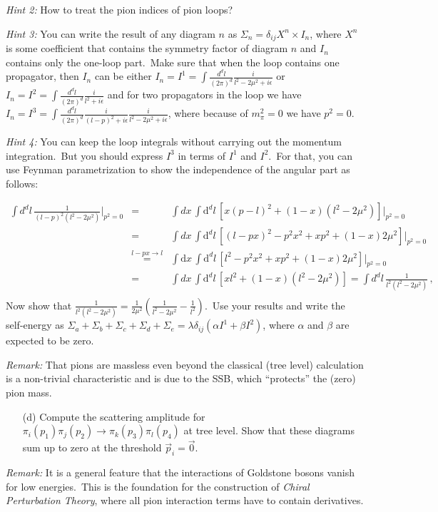 \documentclass[prd,%
,superscriptaddress,%
nofootinbib,%
tightenlines ]{revtex4}
\newcommand{\dd}{\mathrm{d}}
\newcommand{\comment}[1]{\textbf{[#1]}}
\begin{document}
\begin{itemize}
\emph{Hint 2:} How to treat the pion indices of pion loops?


\emph{Hint 3:} You can write the result of any diagram $n$ as $\Sigma_n = \delta_{i j} X^n \times I_n$, where $X^n$ is some coefficient that contains the symmetry factor of diagram $n$ and $I_n$ contains only the one-loop part.~Make sure that when the loop contains one propagator, then $I_n$ can be either $ I_n  = I^1 = \int \frac{d^d l }{(2\pi)^d } \frac{i}{l^2 - 2 \mu^2 + i \epsilon }$ or $I_n = I^2  = \int \frac{d^d l }{(2\pi)^d} \frac{i}{l^2  + i \epsilon }$ and  for two propagators in the loop we have $I_n = I^3 = \int \frac{d^d l }{(2\pi)^d } \frac{i}{(l-p)^2 + i \epsilon } \frac{i}{l^2 - 2 \mu^2 + i \epsilon}$, where because of $m_\pi^2 = 0$ we have $p^2 = 0$. 

\emph{Hint 4:} You can keep the loop integrals without carrying out the momentum integration.~But you should express $I^3$ in terms of $I^1$ and $I^2$.~For that, you can use Feynman parametrization to show the independence of the angular part as follows:

\begin{eqnarray}
\int d^d l\,\frac{1}{(l-p)^2\left(l^2-2\mu^2\right)}|_{p^2=0}
\!\!\!&=&\!\!\!
\int d x\, \int \dd^d l\, \left[x(p-l)^2+(1-x)(l^2-2\mu^2)\right]|_{p^2=0}
\nonumber
\\
\!\!\!&=&\!\!\!
\int d x\, \int \dd^d l\, \left[(l-px)^2-p^2x^2+xp^2+(1-x)2\mu^2\right]\big\vert_{p^2=0}
\nonumber
\\
\!\!\!&\overset{l-px\rightarrow l}{=}&\!\!\!
\int \dd x\, \int \dd^d l\, \left[l^2-p^2x^2+xp^2+(1-x)2\mu^2\right]|_{p^2=0}
\nonumber
\\
\!\!\!&=&\!\!\!
\int d x\, \int \dd^d l\, \left[xl^2+(1-x)(l^2-2\mu^2)\right]=\int d^d l\,\frac{1}{l^2\left(l^2-2\mu^2\right)}
\,,
\nonumber
\\
\end{eqnarray}
Now show that $\frac{1}{l^2\left(l^2-2\mu^2\right)} = \frac{1}{2\mu^2}\left(\frac{1}{l^2-2\mu^2}-\frac{1}{l^2} \right)$.~Use your results and write the self-energy as $\Sigma_{a}+\Sigma_{b}+\Sigma_{c}+\Sigma_{d}+\Sigma_{e} = \lambda \delta_{i j} \left(  \alpha I^1 + \beta I^2 \right)$, where $\alpha$ and $ \beta $ are expected to be zero.
\end{itemize}
\emph{Remark:} That pions are massless even beyond the classical (tree level) calculation  is a non-trivial characteristic and is due to the SSB, which ``protects'' the (zero) pion mass.
\begin{itemize} 
	\item[(d)] Compute the scattering amplitude for 
	$\pi_i(p_1) \pi_j(p_2) \rightarrow \pi_k(p_3) \pi_l(p_4)$ 
	at tree level.
	Show that these diagrams sum up to zero at the threshold $\vec{p}_i=\vec{0}$.
\end{itemize}	
\emph{Remark:} It is a general feature that the interactions of Goldstone bosons vanish for low energies.~This is the foundation for the construction of \emph{Chiral Perturbation Theory}, where all pion interaction terms have to contain derivatives.
\end{document}
